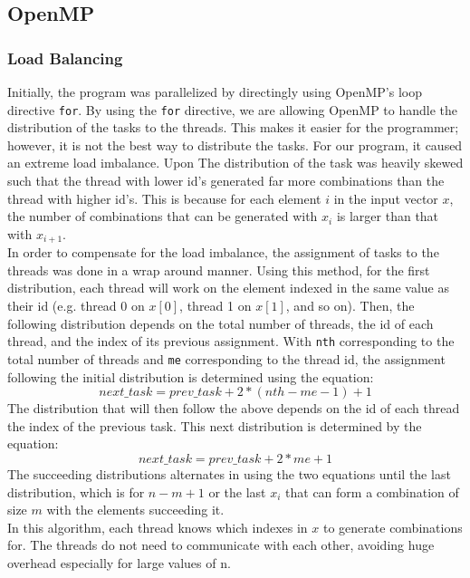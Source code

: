 \subsection{OpenMP}

\subsubsection{Load Balancing}
Initially, the program was parallelized by directingly using OpenMP's loop directive \texttt{for}. By using the \texttt{for} directive, we are allowing OpenMP to handle the distribution of the tasks to the threads. This makes it easier for the programmer; however, it is not the best way to distribute the tasks. For our program, it caused an extreme load imbalance. Upon The distribution of the task was heavily skewed such that the thread with lower id's generated far more combinations than the thread with higher id's. This is because for each element $i$ in the input vector $x$, the number of combinations that can be generated with $x_{i}$ is larger than that with $x_{i+1}$.\\
\null
In order to compensate for the load imbalance, the assignment of tasks to the threads was done in a wrap around manner. Using this method, for the first distribution, each thread will work on the element indexed in the same value as their id (e.g. thread 0 on $x[0]$, thread 1 on $x[1]$, and so on). Then, the following distribution depends on the total number of threads, the id of each thread, and the index of its previous assignment. With \texttt{nth} corresponding to the total number of threads and \texttt{me} corresponding to the thread id, the assignment following the initial distribution is determined using the equation:
\begin{equation}
next\_task = prev\_task + 2 * (nth - me - 1) + 1
\end{equation}
The distribution that will then follow the above depends on the id of each thread the index of the previous task. This next distribution is determined by the equation:
\begin{equation}
next\_task = prev\_task + 2 * me + 1
\end{equation}
The succeeding distributions alternates in using the two equations until the last distribution, which is for $n - m + 1$ or the last $x_{i}$ that can form a combination of size $m$ with the elements succeeding it.\\
\null
In this algorithm, each thread knows which indexes in $x$ to generate combinations for. The threads do not need to communicate with each other, avoiding huge overhead especially for large values of n.

